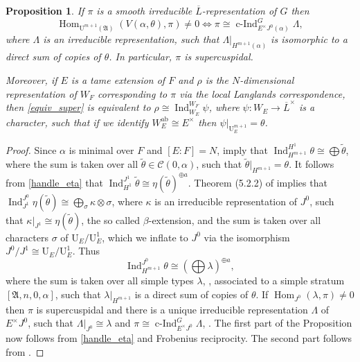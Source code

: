 \documentclass[JEP,XML,SOM,Unicode,NoEqCountersInSection]{cedram}
\let\mathcal\mathscr
\newtheorem{prop}{Proposition}[section]
\theoremstyle{definition}
\DeclareMathOperator{\Hom}{Hom}
\DeclareMathOperator{\Ind}{Ind}
\DeclareMathOperator{\cInd}{c-Ind}
\newcommand{\cIndu}[3]{\cInd_{#1}^{#2}{#3}}
\newcommand{\Indu}[3]{\Ind_{#1}^{#2}{#3}}
\newcommand{\Aa}{\mathfrak A}
\newcommand{\UU}{\mathrm U}
\newcommand{\Lbar}{\overline{L}}
\begin{document}
\begin{prop}\label{types_super} If $\pi$ is a smooth irreducible $\Lbar$-representation of $G$ then
\begin{equation}\label{equiv_super}
\Hom_{\UU^{m+1}(\Aa)}( V(\alpha, \theta), \pi)\neq 0 \iff\pi\cong \cIndu{E^{\times}J^0(\alpha)}{G}{\Lambda},
\end{equation}
where $\Lambda$ is an irreducible representation, such that $\Lambda|_{H^{m+1}(\alpha)}$ is isomorphic to a direct sum of copies of $\theta$. In particular,
$\pi$ is supercuspidal.

Moreover, if $E$ is a tame extension of $F$ and $\rho$ is the $N$-dimensional representation of $W_F$ corresponding to $\pi$ via the
local Langlands correspondence, then \eqref{equiv_super} is equivalent to $\rho\cong \Indu{W_E}{W_F}{\psi}$, where $\psi: W_E \to \Lbar^{\times}$
is a character, such that if we identify $W_E^{\mathrm{ab}}\cong E^{\times}$ then $\psi|_{\UU^{m+1}_E}=\theta$.
\end{prop}

\begin{proof} Since $\alpha$ is minimal over $F$ and $[E:F]=N$, \cite[(3.2.5), (3.3.18)]{BK} imply that $\Indu{H^{m+1}}{H^1}{\theta}\cong \bigoplus \tilde{\theta}$,
where the sum is taken over all $\tilde{\theta}\in \mathcal C(0, \alpha)$, such that \hbox{$\tilde{\theta}|_{H^{m+1}}= \theta$}. It follows from
\eqref{handle_eta} that $\Indu{H^1}{J^1}{\tilde{\theta}}\cong \eta(\tilde{\theta})^{\oplus a}$. Theorem (5.2.2) of \cite{BK} implies that
$\Indu{J^1}{J^0}{\eta(\tilde{\theta})}\cong \bigoplus_{\sigma} \kappa\otimes \sigma$, where $\kappa$ is an irreducible representation of $J^0$, such that $\kappa|_{J^1}\cong \eta(\tilde{\theta})$,
the so called $\beta$-extension, and the sum is taken over all characters $\sigma$ of $\UU_E/\UU^1_E$, which we inflate to $J^0$ via the isomorphism
$J^0/J^1\cong \UU_E/\UU^1_E$. Thus
\begin{equation}
\Indu{H^{m+1}}{J^{0}}{\theta}\cong (\bigoplus \lambda)^{\oplus a},
\end{equation}
where the sum is taken over all simple types $\lambda$, \cite[(5.5.10)]{BK}, associated to a simple stratum $[\mathfrak A, n, 0,\alpha]$, such that
$\lambda |_{H^{m+1}}$ is a direct sum of copies of $\theta$. If $\Hom_{J^0}(\lambda, \pi)\neq 0$ then $\pi$ is supercuspidal and there is a unique
irreducible representation $\Lambda$ of $E^{\times} J^0$, such that $\Lambda|_{J^0}\cong \lambda$ and $\pi\cong \cIndu{E^{\times}J^0}{G}{\Lambda}$, \cite[(6.2.2)]{BK}.
The first part of the Proposition now follows from \eqref{handle_eta} and Frobenius reciprocity. The second part follows from \cite{BH}.
\end{proof}
\end{document}
